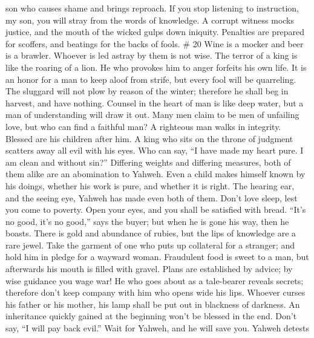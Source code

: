 son who causes shame and brings reproach.  If you stop
listening to instruction, my son, you will stray from the words of
knowledge.  A corrupt witness mocks justice, and the
mouth of the wicked gulps down iniquity.  Penalties are
prepared for scoffers, and beatings for the backs of fools. \# 20
 Wine is a mocker and beer is a brawler. Whoever is led
astray by them is not wise.  The terror of a king is like
the roaring of a lion. He who provokes him to anger forfeits his own
life.  It is an honor for a man to keep aloof from strife,
but every fool will be quarreling.  The sluggard will not
plow by reason of the winter; therefore he shall beg in harvest, and
have nothing.  Counsel in the heart of man is like deep
water, but a man of understanding will draw it out.  Many
men claim to be men of unfailing love, but who can find a faithful man?
 A righteous man walks in integrity. Blessed are his
children after him.  A king who sits on the throne of
judgment scatters away all evil with his eyes.  Who can
say, ``I have made my heart pure. I am clean and without sin?''
 Differing weights and differing measures, both of them
alike are an abomination to Yahweh.  Even a child makes
himself known by his doings, whether his work is pure, and whether it is
right.  The hearing ear, and the seeing eye, Yahweh has
made even both of them.  Don't love sleep, lest you come
to poverty. Open your eyes, and you shall be satisfied with bread.
 ``It's no good, it's no good,'' says the buyer; but when
he is gone his way, then he boasts.  There is gold and
abundance of rubies, but the lips of knowledge are a rare jewel.
 Take the garment of one who puts up collateral for a
stranger; and hold him in pledge for a wayward woman. 
Fraudulent food is sweet to a man, but afterwards his mouth is filled
with gravel.  Plans are established by advice; by wise
guidance you wage war!  He who goes about as a
tale-bearer reveals secrets; therefore don't keep company with him who
opens wide his lips.  Whoever curses his father or his
mother, his lamp shall be put out in blackness of darkness.
 An inheritance quickly gained at the beginning won't be
blessed in the end.  Don't say, ``I will pay back evil.''
Wait for Yahweh, and he will save you.  Yahweh detests

